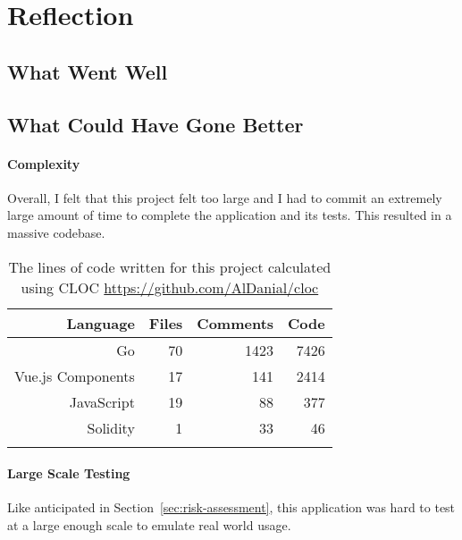 \section{Reflection}

\subsection{What Went Well}



\subsection{What Could Have Gone Better}

\paragraph*{Complexity}
Overall, I felt that this project felt too large and I had to commit an extremely large amount of time to complete the application and its tests. This resulted in a massive codebase.

\begin{longtable}{ | r | r | r | r | }
  \hline
  \textbf{Language} & \textbf{Files} & \textbf{Comments} & \textbf{Code}
  \\\hline
  Go
  & 70
  & 1423
  & 7426
  \\\hline
  Vue.js Components
  & 17
  & 141
  & 2414
  \\\hline
  JavaScript
  & 19
  & 88
  & 377
  \\\hline
  Solidity
  & 1
  & 33
  & 46
  \\\hline
  \caption{The lines of code written for this project calculated using CLOC \url{https://github.com/AlDanial/cloc}}
\end{longtable}

\paragraph*{Large Scale Testing}
Like anticipated in Section~\ref{sec:risk-assessment}, this application was hard to test at a large enough scale to emulate real world usage.